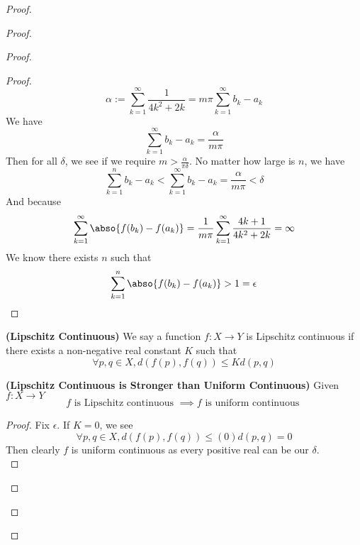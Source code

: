 \documentclass{report}
\begin{document}
\begin{proof}
\begin{proof}
\begin{proof}
\begin{proof}
\begin{equation*}
\alpha :=\sum_{k=1}^\infty \frac{1}{4k^2+2k}=m\pi \sum_{k=1}^\infty b_k-a_k
\end{equation*}
We have 
\begin{equation*}
\sum_{k=1}^\infty b_k-a_k=\frac{\alpha }{m \pi}
\end{equation*}
Then for all $\delta$, we see if we require $m>\frac{\alpha}{\pi \delta}$. No matter how large is $n$, we have 
 \begin{equation*}
\sum_{k=1}^n b_k-a_k<\sum_{k=1}^\infty b_k-a_k=\frac{\alpha }{m \pi}<\delta
\end{equation*}
And because 
\begin{equation*}
\sum_{k=1}^\infty \abso{f(b_k)-f(a_k)}=\frac{1}{m \pi }\sum_{k=1}^\infty \frac{4k+1}{4k^2+2k}=\infty
\end{equation*}
We know there exists $n$ such that 
 \begin{equation*}
\sum_{k=1}^n \abso{f(b_k)-f(a_k)}>1=\epsilon 
\end{equation*}
\end{proof}
\begin{definition}
\label{5.5.4}
\textbf{(Lipschitz Continuous)} We say a function $f:X\rightarrow Y$ is Lipschitz continuous if there exists a non-negative real constant $K$ such that 
\begin{equation*}
\forall p,q\in X, d(f(p),f(q))\leq Kd(p,q)
\end{equation*}
\end{definition}
\begin{theorem}
\label{5.5.5}
\textbf{(Lipschitz Continuous is Stronger than Uniform Continuous)} Given $f:X\rightarrow Y$
\begin{equation*}
f\text{ is Lipschitz continuous }\implies f\text{ is uniform continuous }
\end{equation*}
\end{theorem}
\begin{proof}
Fix $\epsilon $. If $K=0$, we see 
 \begin{equation*}
\forall p,q\in X, d(f(p),f(q))\leq (0)d(p,q)=0
\end{equation*}
Then clearly $f$ is uniform continuous as every positive real can be our $\delta$.\\



\end{proof}
\end{proof}
\end{proof}
\end{proof}
\end{document}

